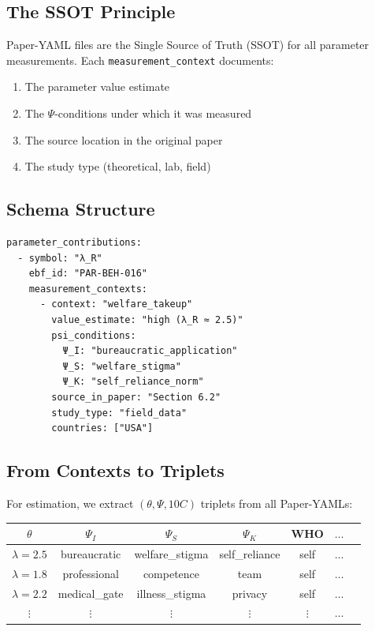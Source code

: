 \subsection{The SSOT Principle}

\begin{axiom}
\label{ax:pct-4}
Paper-YAML files are the Single Source of Truth (SSOT) for all parameter measurements.
Each \texttt{measurement\_context} documents:
\begin{enumerate}
    \item The parameter value estimate
    \item The $\Psi$-conditions under which it was measured
    \item The source location in the original paper
    \item The study type (theoretical, lab, field)
\end{enumerate}
\end{axiom}

\subsection{Schema Structure}

\begin{verbatim}
parameter_contributions:
  - symbol: "λ_R"
    ebf_id: "PAR-BEH-016"
    measurement_contexts:
      - context: "welfare_takeup"
        value_estimate: "high (λ_R ≈ 2.5)"
        psi_conditions:
          Ψ_I: "bureaucratic_application"
          Ψ_S: "welfare_stigma"
          Ψ_K: "self_reliance_norm"
        source_in_paper: "Section 6.2"
        study_type: "field_data"
        countries: ["USA"]
\end{verbatim}

\subsection{From Contexts to Triplets}

For estimation, we extract $(θ, Ψ, 10C)$ triplets from all Paper-YAMLs:

\begin{center}
\begin{tabular}{ccccccc}
\toprule
$\theta$ & $\Psi_I$ & $\Psi_S$ & $\Psi_K$ & WHO & $\ldots$ \\
\midrule
$\lambda = 2.5$ & bureaucratic & welfare\_stigma & self\_reliance & self & $\ldots$ \\
$\lambda = 1.8$ & professional & competence & team & self & $\ldots$ \\
$\lambda = 2.2$ & medical\_gate & illness\_stigma & privacy & self & $\ldots$ \\
$\vdots$ & $\vdots$ & $\vdots$ & $\vdots$ & $\vdots$ & $\ldots$ \\
\bottomrule
\end{tabular}
\end{center}


